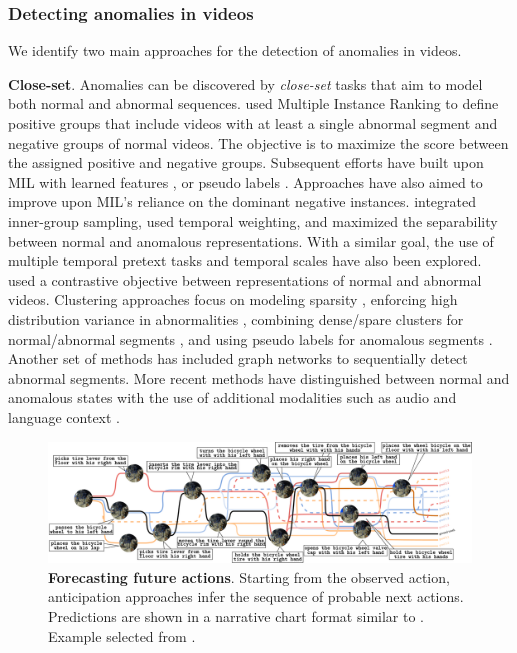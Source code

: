\subsubsection{Detecting anomalies in videos}

We identify two main approaches for the detection of anomalies in videos.

\noindent
\textbf{Close-set}. Anomalies can be discovered by \emph{close-set} tasks that aim to model both normal and abnormal sequences. \citet{sultani2018real} used Multiple Instance Ranking \citep{dietterich1997solving} to define positive groups that include videos with at least a single abnormal segment and negative groups of normal videos. The objective is to maximize the score between the assigned positive and negative groups. Subsequent efforts have built upon MIL with learned features \citep{dubey20193d}, or pseudo labels \citep{feng2021mist}. Approaches have also aimed to improve upon MIL's reliance on the dominant negative instances. \citet{zhang2019temporal} integrated inner-group sampling, \citet{pu2023learning,zhu2019motion} used temporal weighting, and \citet{tian2021weakly} maximized the separability between normal and anomalous representations. With a similar goal, the use of multiple temporal pretext tasks \citep{almarri2024multi,georgescu2021anomaly} and temporal scales \citep{li2022scale} have also been explored. \citet{chen2023mgfn} used a contrastive objective between representations of normal and abnormal videos. Clustering approaches focus on modeling sparsity \citep{lu2013abnormal}, enforcing high distribution variance in abnormalities \citep{li2021deep}, combining dense/spare clusters for normal/abnormal segments \citep{zaheer2020claws}, and using pseudo labels for anomalous segments \citep{zaheer2020self}. Another set of methods \citep{zhong2019graph,purwanto2021dance} has included graph networks to sequentially detect abnormal segments. More recent methods have distinguished between normal and anomalous states with the use of additional modalities such as audio \citep{wu2020not} and language context \citep{yang2024text,zanella2024harnessing}.


\begin{figure}[!ht]
    \centering
    \includegraphics[width=\linewidth,trim={0cm 0 0cm 0},clip]{figs/narrative_chart_ego_exo.pdf}
    \caption{\textbf{Forecasting future actions}. Starting from the observed action, anticipation approaches infer the sequence of probable next actions. Predictions are shown in a narrative chart format similar to \citet{randal2009movie}.
    Example selected from \citet{grauman2024ego}.} 
    \label{fig:narration_chart}
\end{figure}

